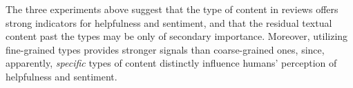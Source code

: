 The three experiments above suggest that the type of content in reviews offers strong indicators for helpfulness and sentiment, and that the residual textual content past the types may be only of secondary importance. Moreover, utilizing fine-grained types provides stronger signals than coarse-grained ones, since, apparently, \textit{specific} types of content distinctly influence humans' perception of helpfulness and sentiment.









%
%
%
%
%






